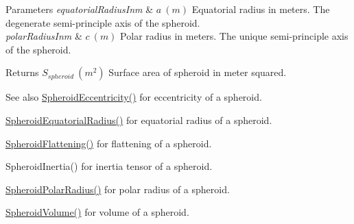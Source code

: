 \begin{DoxyParams}{Parameters}
{\em equatorial\+Radius\+Inm} & $ a\ (m)$ Equatorial radius in meters. The degenerate semi-\/principle axis of the spheroid. \\
\hline
{\em polar\+Radius\+Inm} & $ c\ (m)$ Polar radius in meters. The unique semi-\/principle axis of the spheroid. \\
\hline
\end{DoxyParams}
\begin{DoxyReturn}{Returns}
$ S_{spheroid}\ (m^2)$ Surface area of spheroid in meter squared. 
\end{DoxyReturn}
\begin{DoxySeeAlso}{See also}
\mbox{\hyperlink{group___e_g_x_math-_geometry-3_d-_spheroid-_eccentricity_gab45680528a41bb7a5e15ddc0059156dd}{Spheroid\+Eccentricity()}} for eccentricity of a spheroid. 

\mbox{\hyperlink{group___e_g_x_math-_geometry-3_d-_spheroid-_equatorial_radius_ga1cbe564fee1b509c622d1c6d276158cd}{Spheroid\+Equatorial\+Radius()}} for equatorial radius of a spheroid. 

\mbox{\hyperlink{group___e_g_x_math-_geometry-3_d-_spheroid-_flattening_ga05e3be91f5f7fbaa9371687aa3834179}{Spheroid\+Flattening()}} for flattening of a spheroid. 

Spheroid\+Inertia() for inertia tensor of a spheroid. 

\mbox{\hyperlink{group___e_g_x_math-_geometry-3_d-_spheroid-_polar_radius_gad4791a46a7efe39c63c03d2366fdd3d2}{Spheroid\+Polar\+Radius()}} for polar radius of a spheroid. 

\mbox{\hyperlink{group___e_g_x_math-_geometry-3_d-_spheroid-_volume_ga12125484235e94b8f2580f3476b05b92}{Spheroid\+Volume()}} for volume of a spheroid. 
\end{DoxySeeAlso}
